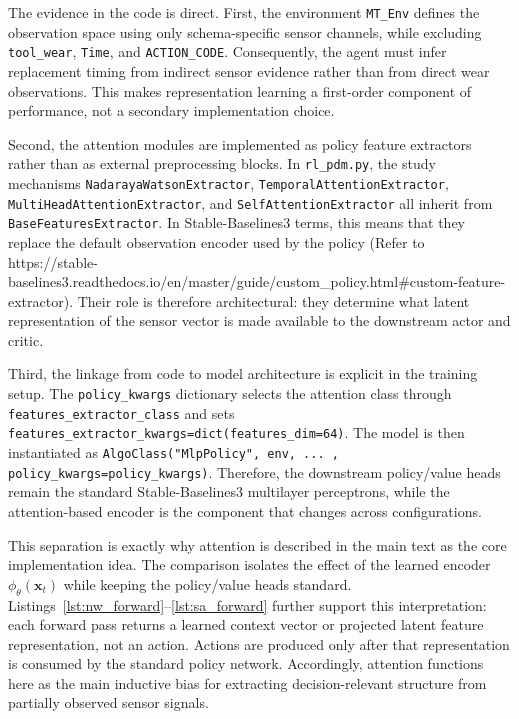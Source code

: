 \documentclass[sn-basic]{sn-jnl} %
\begin{document}
\begin{appendices}
The evidence in the code is direct. First, the environment \texttt{MT\_Env} defines the observation space using only schema-specific sensor channels, while excluding \texttt{tool\_wear}, \texttt{Time}, and \texttt{ACTION\_CODE}. Consequently, the agent must infer replacement timing from indirect sensor evidence rather than from direct wear observations. This makes representation learning a first-order component of performance, not a secondary implementation choice.

Second, the attention modules are implemented as policy feature extractors rather than as external preprocessing blocks. In \texttt{rl\_pdm.py}, the study mechanisms \texttt{NadarayaWatsonExtractor}, \texttt{TemporalAttentionExtractor}, \texttt{MultiHeadAttentionExtractor}, and \texttt{SelfAttentionExtractor} all inherit from \texttt{BaseFeaturesExtractor}. In Stable-Baselines3 terms, this means that they replace the default observation encoder used by the policy (Refer to https://stable-baselines3.readthedocs.io/en/master/guide/custom_policy.html#custom-feature-extractor). Their role is therefore architectural: they determine what latent representation of the sensor vector is made available to the downstream actor and critic.

Third, the linkage from code to model architecture is explicit in the training setup. The \texttt{policy\_kwargs} dictionary selects the attention class through \texttt{features\_extractor\_class} and sets \texttt{features\_extractor\_kwargs=dict(features\_dim=64)}. The model is then instantiated as \texttt{AlgoClass("MlpPolicy", env, ... , policy\_kwargs=policy\_kwargs)}. Therefore, the downstream policy/value heads remain the standard Stable-Baselines3 multilayer perceptrons, while the attention-based encoder is the component that changes across configurations.

This separation is exactly why attention is described in the main text as the core implementation idea. The comparison isolates the effect of the learned encoder $\phi_\theta(\mathbf{x}_t)$ while keeping the policy/value heads standard. Listings~\ref{lst:nw_forward}--\ref{lst:sa_forward} further support this interpretation: each forward pass returns a learned context vector or projected latent feature representation, not an action. Actions are produced only after that representation is consumed by the standard policy network. Accordingly, attention functions here as the main inductive bias for extracting decision-relevant structure from partially observed sensor signals.


\end{appendices}
\end{document}
